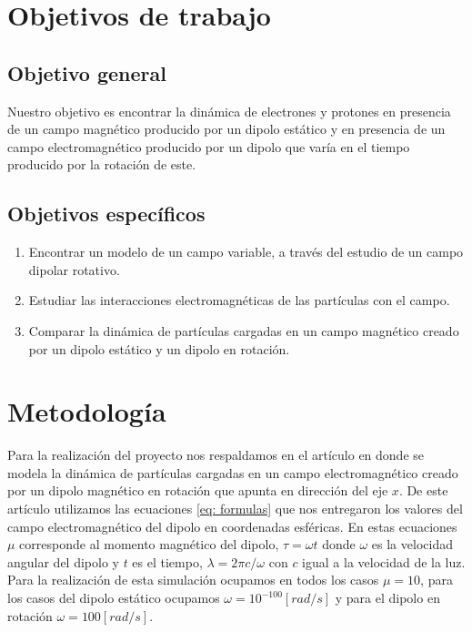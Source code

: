 \documentclass{article}
\begin{document}



\section*{Objetivos de trabajo}


\subsection*{Objetivo general}

Nuestro objetivo es encontrar la dinámica de electrones y protones en presencia de un campo magnético producido por un dipolo estático y en presencia de un campo electromagnético producido por un dipolo que varía en el tiempo producido por la rotación de este.

\subsection*{Objetivos específicos}
\begin{enumerate}
\item Encontrar un  modelo de un campo variable, a través del estudio de un campo dipolar rotativo.

\item Estudiar las interacciones electromagnéticas de las partículas con el campo.

\item Comparar la dinámica de partículas cargadas en un campo magnético creado por un dipolo estático y un dipolo en rotación.
\end{enumerate}



\section*{Metodología}

Para la realización del proyecto nos respaldamos en el artículo \cite{paper_estudio} en donde se modela la dinámica de partículas cargadas en un campo electromagnético creado por un dipolo magnético en rotación que apunta en dirección del eje $x$. De este artículo utilizamos las ecuaciones \ref{eq: formulas}
 que nos entregaron los valores del campo electromagnético del dipolo en coordenadas esféricas. En estas ecuaciones $\mu$ corresponde al momento magnético del dipolo, $\tau=\omega t$ donde $\omega$ es la velocidad angular del dipolo y $t$ es el tiempo, $\lambda= 2\pi c / \omega$ con $c$ igual a la velocidad de la luz. Para la realización de esta simulación ocupamos en todos los casos $\mu=10$, para los casos del dipolo estático ocupamos  $\omega= 10^{-100}[rad/s]$ y para el dipolo en rotación $\omega = 100[rad/s]$.
\end{document}
